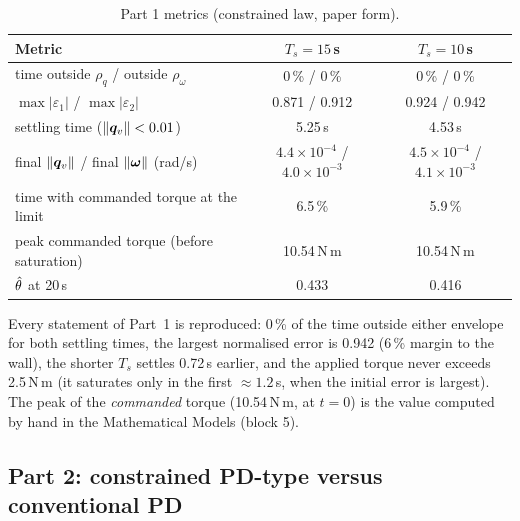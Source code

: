 \begin{table}[H]
\centering\small
\caption{Part 1 metrics (constrained law, paper form).}
\label{tab:part1}
\begin{tabular}{@{}lcc@{}}
\toprule
\textbf{Metric} & $T_s=15$\,s & $T_s=10$\,s\\
\midrule
time outside $\rho_q$ / outside $\rho_\omega$ & 0\,\% / 0\,\% & 0\,\% / 0\,\%\\
$\max|\varepsilon_1|$ / $\max|\varepsilon_2|$ & 0.871 / 0.912 & 0.924 / 0.942\\
settling time ($\|\bm{q}_v\|<0.01$) & 5.25\,s & 4.53\,s\\
final $\|\bm{q}_v\|$ / final $\|\bm{\omega}\|$ (rad/s) & $4.4\times10^{-4}$ / $4.0\times10^{-3}$ & $4.5\times10^{-4}$ / $4.1\times10^{-3}$\\
time with commanded torque at the limit & 6.5\,\% & 5.9\,\%\\
peak commanded torque (before saturation) & 10.54\,N\,m & 10.54\,N\,m\\
$\hat{\theta}$ at 20\,s & 0.433 & 0.416\\
\bottomrule
\end{tabular}
\end{table}


\begin{projbox}[result]
Every statement of Part~1 is reproduced: 0\,\% of the time outside either envelope for both settling times, the largest
normalised error is 0.942 (6\,\% margin to the wall), the shorter $T_s$ settles 0.72\,s earlier, and the applied torque
never exceeds 2.5\,N\,m (it saturates only in the first $\approx1.2$\,s, when the initial error is largest). The peak of the
\emph{commanded} torque (10.54\,N\,m, at $t=0$) is the value computed by hand in the Mathematical Models (block 5).
\end{projbox}

\subsection{Part 2: constrained PD-type versus conventional PD}
\label{sec:part2}

